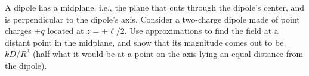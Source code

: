         A dipole has a midplane, i.e., the plane that cuts through the dipole's
        center, and is perpendicular to the dipole's axis.
        Consider a two-charge dipole made of point charges $\pm q$ located
        at $z=\pm\ell/2$. Use approximations to find the field at a distant
        point in the midplane, and show that its magnitude comes out to be 
        $kD/R^3$ (half what it would be at a point on the axis lying an equal distance
        from the dipole).
